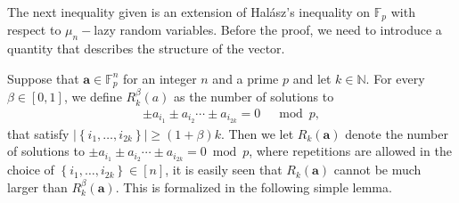 \documentclass{article}
\numberwithin{equation}{section}
\theoremstyle{plain}
\begin{document}
The next inequality given is an extension of Hal\'{a}sz's inequality \cite{MR494478} on $\mathbb{F}_p$ with respect to $\mu_n-$lazy random variables. Before the proof, we need to introduce a quantity that describes the structure of the vector.
\par
Suppose that $\boldsymbol{a} \in \mathbb{F}_p^n$ for an integer $n$ and a prime $p$ and let $k \in \mathbb{N}$. For every $\beta \in[0,1]$, we define $R_k^\beta(a)$ as the number of solutions to
\begin{align*}
\pm a_{i_1} \pm a_{i_2} \cdots \pm a_{i_{2 k}}=0 \quad \bmod p,
\end{align*}
that satisfy $\left|\left\{i_1, \ldots, i_{2 k}\right\}\right| \geqslant(1+\beta) k$. Then we let $R_k(\boldsymbol{a})$ denote the number of solutions to $\pm a_{i_1} \pm a_{i_2} \cdots \pm a_{i_{2 k}}=0 \bmod p$, where repetitions are allowed in the choice of $\left\{i_1, \ldots, i_{2 k}\right\}\in[n]$, it is easily seen that $R_k(\boldsymbol{a})$ cannot be much larger than $R_k^\beta(\boldsymbol{a})$. This is formalized in the following simple lemma.
\end{document}
